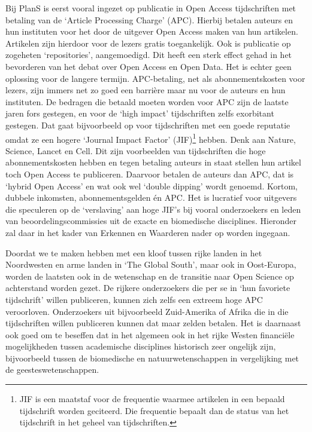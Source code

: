 \documentclass{jote-book}
\begin{document}
	Bij PlanS is eerst vooral ingezet op publicatie in Open Access tijdschriften met betaling van de ‘Article Processing Charge' (APC). Hierbij betalen auteurs en hun instituten voor het door de uitgever Open Access maken van hun artikelen. Artikelen zijn hierdoor voor de lezers gratis toegankelijk. Ook is publicatie op zogeheten ‘repositories', aangemoedigd. Dit heeft een sterk effect gehad in het bevorderen van het debat over Open Access en Open Data. Het is echter geen oplossing voor de langere termijn. APC-betaling, net als abonnementskosten voor lezers, zijn immers net zo goed een barrière maar nu voor de auteurs en hun instituten. De bedragen die betaald moeten worden voor APC zijn de laatste jaren fors gestegen, en voor de ‘high impact' tijdschriften zelfs exorbitant gestegen. Dat gaat bijvoorbeeld op voor tijdschriften met een goede reputatie omdat ze een hogere ‘Journal Impact Factor' (JIF)\footnote{JIF is een maatstaf voor de frequentie waarmee artikelen in een bepaald tijdschrift worden geciteerd. Die frequentie bepaalt dan de status van het tijdschrift in het geheel van tijdschriften.} hebben. Denk aan Nature, Science, Lancet en Cell. Dit zijn voorbeelden van tijdschriften die hoge abonnementskosten hebben en tegen betaling auteurs in staat stellen hun artikel toch Open Access te publiceren. Daarvoor betalen de auteurs dan APC, dat is ‘hybrid Open Access' en wat ook wel ‘double dipping' wordt genoemd. Kortom, dubbele inkomsten, abonnementsgelden én APC. Het is lucratief voor uitgevers die speculeren op de ‘verslaving' aan hoge JIF's bij vooral onderzoekers en leden van beoordelingscommissies uit de exacte en biomedische disciplines. Hieronder zal daar in het kader van Erkennen en Waarderen nader op worden ingegaan.



	Doordat we te maken hebben met een kloof tussen rijke landen in het Noordwesten en arme landen in ‘The Global South', maar ook in Oost-Europa, worden de laatsten ook in de wetenschap en de transitie naar Open Science op achterstand worden gezet. De rijkere onderzoekers die per se in ‘hun favoriete tijdschrift' willen publiceren, kunnen zich zelfs een extreem hoge APC veroorloven. Onderzoekers uit bijvoorbeeld Zuid-Amerika of Afrika die in die tijdschriften willen publiceren kunnen dat maar zelden betalen. Het is daarnaast ook goed om te beseffen dat in het algemeen ook in het rijke Westen financiële mogelijkheden tussen academische disciplines historisch zeer ongelijk zijn, bijvoorbeeld tussen de biomedische en natuurwetenschappen in vergelijking met de geesteswetenschappen.
\end{document}
